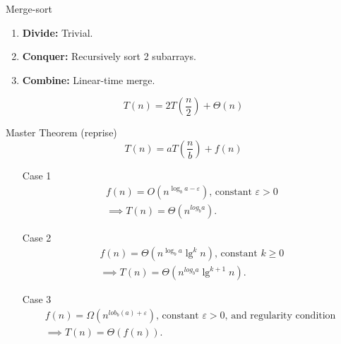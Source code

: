 \documentclass{beamer}
\begin{document}
\begin{frame}{Merge-sort}
    \begin{enumerate}
        \item \textbf{\Large Divide:} Trivial.
        \item \textbf{\Large Conquer:} Recursively sort 2 subarrays.
        \item \textbf{\Large Combine:} Linear-time merge.
    \end{enumerate}
    \vspace{4mm}
    $$
        T(n) = 2T\left(\frac{n}{2}\right) + \Theta(n)
    $$ \pause
\end{frame}

\begin{frame}{Master Theorem (reprise)}
    \small
    $$
        T(n) = aT\left(\frac{n}{b}\right) + f(n)
    $$ \pause
    \begin{itemize}
        \vspace{-5mm}
        \item[Case 1]
            \begin{align*}
                f(n) = O\left(n^{\log_b a - \varepsilon} \right) \text{, constant }\varepsilon > 0 \\ \implies T(n) = \Theta(n^{log_b a}) \text{.}
            \end{align*} \pause
        \vspace{-5mm}
        \item[Case 2]
            \begin{align*}
                f(n) = \Theta\left(n^{\log_b a}\lg^k n \right) \text{, constant }k \geq 0 \\ \implies T(n) = \Theta(n^{log_b a}\lg^{k + 1} n) \text{.}
            \end{align*} \pause
        \vspace{-5mm}
        \item[Case 3]
            \begin{align*}
                f(n) = \Omega\left(n^{lob_b(a) + \varepsilon} \right) \text{, constant }\varepsilon > 0 \text{, and regularity condition } \\ \implies T(n) = \Theta(f(n)) \text{.}
            \end{align*} \pause
    \end{itemize}
\end{frame}
\end{document}
